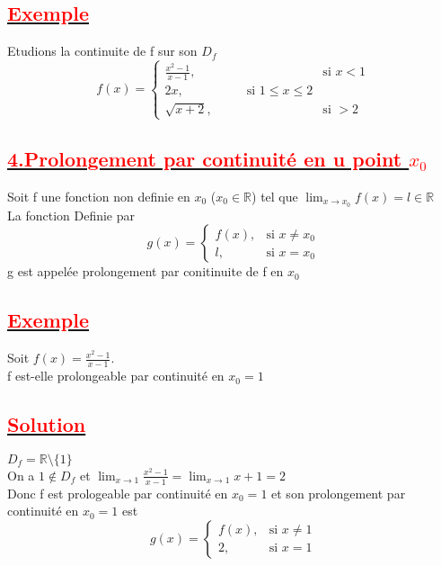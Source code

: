\documentclass[12pt]{article}
\begin{document}
\subsection*{\underline{\textbf{\textcolor{red}{Exemple}}}}
Etudions la continuite de f sur son $D_{f}$\\
\[ f(x) = \begin{cases} 
  \frac{x^2-1}{x-1}, & \text{si } x < 1 \\
   2x,\quad\quad\quad\quad\quad \text{si } 1 \leq x \leq 2\\
  \sqrt{x+2}, & \text{si } > 2
\end{cases} \]
\subsection*{\underline{\textbf{\textcolor{red}{4.Prolongement par continuité en u point $x_{0}$}}}}
Soit f une fonction non definie en $x_{0}$ ($x_{0} \in \mathbb{R}$) tel que $\lim_{x \to x_{0}}f(x)=l \in \mathbb{R}$\\
La fonction Definie par 
\[ g(x) = \begin{cases} 
  f(x), & \text{si } x \neq x_{0} \\
  l, & \text{si } x= x_{0}
\end{cases} \]
g est appelée prolongement par conitinuite de f en $ x_{0} $
\subsection*{\underline{\textbf{\textcolor{red}{Exemple}}}}
Soit $f(x)=\frac{x^{2}-1}{x-1}$.\\
f est-elle prolongeable par continuité en $ x_{0}=1$
\subsection*{\underline{\textbf{\textcolor{red}{Solution}}}}
$D_{f}=\mathbb{R}\setminus\{1\}$\\
On a $1 \notin D_{f}$ et $\lim_{x \to 1}\frac{x^{2}-1}{x-1}=\lim_{x \to 1} x+1=2$\\
Donc f est prologeable par continuité en $x_{0}=1$ et son prolongement par continuité en $x_{0}=1$ est 
\[ g(x) = \begin{cases} 
  f(x), & \text{si } x \neq 1 \\
  2, & \text{si } x= 1
\end{cases} \]
\subsection*{\underline{\textbf{\textcolor{red}{}}}}
\end{document}
